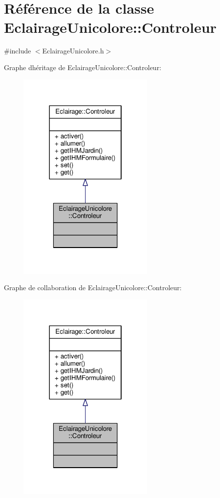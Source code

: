 \hypertarget{classEclairageUnicolore_1_1Controleur}{}\section{Référence de la classe Eclairage\+Unicolore\+:\+:Controleur}
\label{classEclairageUnicolore_1_1Controleur}


{\ttfamily \#include $<$Eclairage\+Unicolore.\+h$>$}



Graphe d\textquotesingle{}héritage de Eclairage\+Unicolore\+:\+:Controleur\+:\nopagebreak
\begin{figure}[H]
\begin{center}
\leavevmode
\includegraphics[width=190pt]{classEclairageUnicolore_1_1Controleur__inherit__graph}
\end{center}
\end{figure}


Graphe de collaboration de Eclairage\+Unicolore\+:\+:Controleur\+:\nopagebreak
\begin{figure}[H]
\begin{center}
\leavevmode
\includegraphics[width=190pt]{classEclairageUnicolore_1_1Controleur__coll__graph}
\end{center}
\end{figure}
